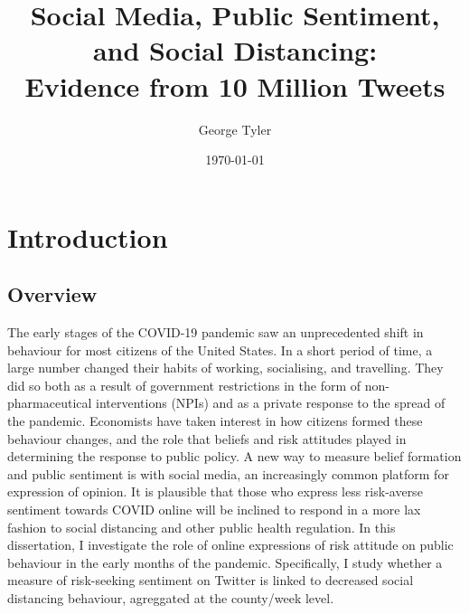 \documentclass{article}
\author{George Tyler}
\date{\today}
\begin{document}
\title{Social Media, Public Sentiment, and Social Distancing: \\ Evidence from 10 Million Tweets}

\maketitle

\section{Introduction}
\subsection{Overview}
The early stages of the COVID-19 pandemic saw an unprecedented shift in behaviour for most citizens of the United States. In a short period of time, a large number changed their habits of working, socialising, and travelling. They did so both as a result of government restrictions in the form of non-pharmaceutical interventions (NPIs) and as a private response to the spread of the pandemic. Economists have taken interest in how citizens formed these behaviour changes, and the role that beliefs and risk attitudes played in determining the response to public policy. A new way to measure belief formation and public sentiment is with social media, an increasingly common platform for expression of opinion. It is plausible that those who express less risk-averse sentiment towards COVID online will be inclined to respond in a more lax fashion to social distancing and other public health regulation. In this dissertation, I investigate the role of online expressions of risk attitude on public behaviour in the early months of the pandemic. Specifically, I study whether a measure of risk-seeking sentiment on Twitter is linked to decreased social distancing behaviour, agreggated at the county/week level. 
\end{document}
